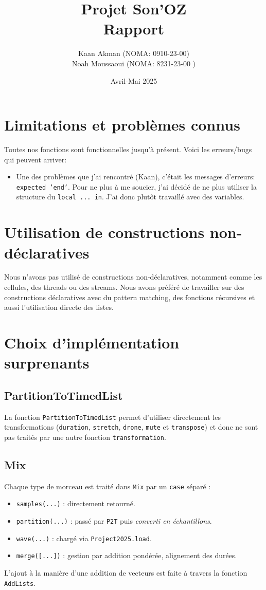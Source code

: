 \documentclass[a4paper,11pt]{article}
\title{Projet Son'OZ\\Rapport}
\author{Kaan Akman (NOMA: 0910-23-00) \\ Noah Moussaoui (NOMA: 8231-23-00 )}
\date{Avril-Mai 2025}
\begin{document}
\maketitle

\section{Limitations et problèmes connus}

Toutes nos fonctions sont fonctionnelles jusqu'à présent. Voici les erreurs/bugs qui peuvent arriver:
\begin{itemize}
    \item Une des problèmes que j'ai rencontré (Kaan), c'était les messages d'erreurs: \texttt{expected 'end'}. Pour ne plus à me soucier, j'ai décidé de ne plus utiliser la structure du \texttt{local ... in}. J'ai donc plutôt travaillé avec des variables.\end{itemize}


\section{Utilisation de constructions non-déclaratives}

Nous n'avons pas utilisé de constructions non-déclaratives, notamment comme les cellules, des threads ou des streams. Nous avons préféré de travailler sur des constructions déclaratives avec du pattern matching, des fonctions récursives et aussi l'utilisation directe des listes.

\section{Choix d'implémentation surprenants}

\subsection*{PartitionToTimedList}
La fonction \texttt{PartitionToTimedList} permet d'utiliser directement les transformations (\texttt{duration}, \texttt{stretch}, \texttt{drone}, \texttt{mute} et \texttt{transpose}) et donc ne sont pas traités par une autre fonction \texttt{transformation}.

\subsection*{Mix}
Chaque type de morceau est traité dans \texttt{Mix} par un \texttt{case} séparé :
\begin{itemize}
    \item \texttt{samples(...)} : directement retourné.
    \item \texttt{partition(...)} : passé par \texttt{P2T} puis \textit{converti en échantillons}.
    \item \texttt{wave(...)} : chargé via \texttt{Project2025.load}.
    \item \texttt{merge([...])} : gestion par addition pondérée, alignement des durées.
\end{itemize}
L'ajout à la manière d'une addition de vecteurs est faite à travers la fonction \texttt{AddLists}.
\end{document}
